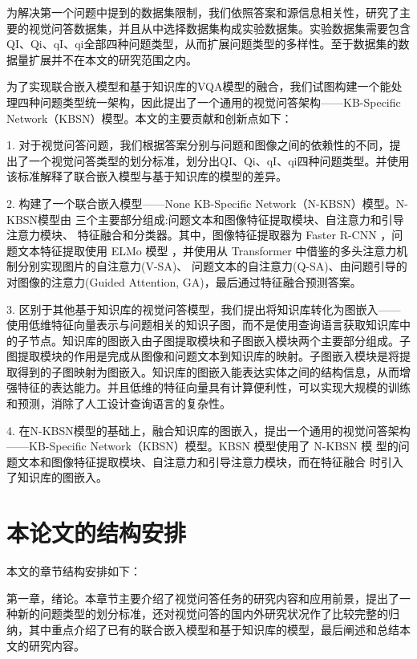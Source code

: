 为解决第一个问题中提到的数据集限制，我们依照答案和源信息相关性，研究了主要的视觉问答数据集，并且从中选择数据集构成实验数据集。实验数据集需要包含QI、Qi、qI、qi全部四种问题类型，从而扩展问题类型的多样性。至于数据集的数据量扩展并不在本文的研究范围之内。

为了实现联合嵌入模型和基于知识库的VQA模型的融合，我们试图构建一个能处理四种问题类型统一架构，因此提出了一个通用的视觉问答架构——KB-Specific Network（KBSN）模型。本文的主要贡献和创新点如下：

1. 对于视觉问答问题，我们根据答案分别与问题和图像之间的依赖性的不同，提出了一个视觉问答类型的划分标准，划分出QI、Qi、qI、qi四种问题类型。并使用该标准解释了联合嵌入模型与基于知识库的模型的差异。

2. 构建了一个联合嵌入模型——None KB-Specific Network（N-KBSN）模型。N-KBSN模型由
三个主要部分组成:问题文本和图像特征提取模块、自注意力和引导注意力模块、 特征融合和分类器。其中，图像特征提取器为 Faster R-CNN ，问题文本特征提取使用 ELMo 模型 ，并使用从 Transformer 中借鉴的多头注意力机制分别实现图片的自注意力(V-SA)、 问题文本的自注意力(Q-SA)、由问题引导的对图像的注意力(Guided Attention, GA)，最后通过特征融合预测答案。

3. 区别于其他基于知识库的视觉问答模型，我们提出将知识库转化为图嵌入——使用低维特征向量表示与问题相关的知识子图，而不是使用查询语言获取知识库中的子节点。知识库的图嵌入由子图提取模块和子图嵌入模块两个主要部分组成。子图提取模块的作用是完成从图像和问题文本到知识库的映射。子图嵌入模块是将提取得到的子图映射为图嵌入。知识库的图嵌入能表达实体之间的结构信息，从而增强特征的表达能力。并且低维的特征向量具有计算便利性，可以实现大规模的训练和预测，消除了人工设计查询语言的复杂性。

4. 在N-KBSN模型的基础上，融合知识库的图嵌入，提出一个通用的视觉问答架构——KB-Specific Network（KBSN）模型。KBSN 模型使用了 N-KBSN 模 型的问题文本和图像特征提取模块、自注意力和引导注意力模块，而在特征融合 时引入了知识库的图嵌入。

\section{本论文的结构安排}
本文的章节结构安排如下：

第一章，绪论。本章节主要介绍了视觉问答任务的研究内容和应用前景，提出了一种新的问题类型的划分标准，还对视觉问答的国内外研究状况作了比较完整的归纳，其中重点介绍了已有的联合嵌入模型和基于知识库的模型，最后阐述和总结本文的研究内容。

